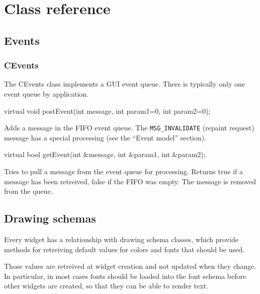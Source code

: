 \documentclass[a4paper,11pt]{journal}
\begin{document}
\section{Class reference}
\subsection{Events}
\subsubsection{CEvents}
The CEvents class implements a GUI event queue. There is typically only one event queue by application.\\
\begin{verbatimtab}virtual void postEvent(int message, int param1=0, int param2=0);\end{verbatimtab}
Adds a message in the FIFO event queue. The \verb!MSG_INVALIDATE! (repaint request) message has a special processing (see the ``Event model'' section).\\
\begin{verbatimtab}virtual bool getEvent(int &message, int &param1, int &param2);\end{verbatimtab}
Tries to pull a message from the event queue for processing. Returns true if a message has been retreived, false if the FIFO was empty. The message is removed from the queue.

\subsection{Drawing schemas}
Every widget has a relationship with drawing schema classes, which provide methods for retreiving default values for colors and fonts that should be used.

Those values are retreived at widget creation and not updated when they change. In particular, in most cases fonts should be loaded into the font schema before other widgets are created, so that they can be able to render text.
\end{document}
